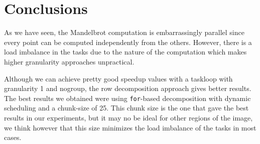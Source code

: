 \section{Conclusions}%
\label{sec:Conclusions}

As we have seen, the Mandelbrot computation is embarrassingly parallel since every point can be computed independently
from the others. However, there is a load imbalance in the tasks due to the nature of the computation which makes
higher granularity approaches unpractical.

Although we can achieve pretty good speedup values with a taskloop with granularity 1 and nogroup, the row
decomposition approach gives better results. The best results we obtained were using \texttt{for}-based decomposition
with dynamic scheduling and a chunk-size of 25. This chunk size is the one that gave the best results in our
experiments, but it may no be ideal for other regions of the image, we think however that this size minimizes
the load imbalance of the tasks in most cases.


